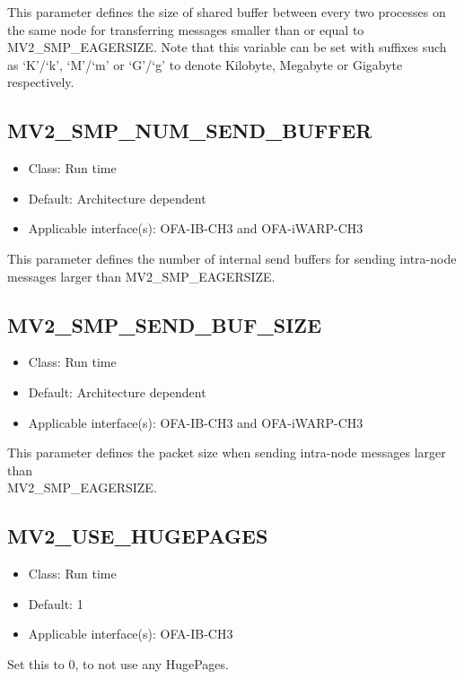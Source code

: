 This parameter defines the size
of shared buffer between every two processes on the same node for transferring
messages smaller than or equal to MV2\_SMP\_EAGERSIZE. 
Note that this variable can be set with suffixes such as `K'/`k', `M'/`m' or `G'/`g'
to denote Kilobyte, Megabyte or Gigabyte respectively.

\subsection{MV2\_SMP\_NUM\_SEND\_BUFFER}
\label{def:smp-num-send-buffer}

\begin{itemize}
        \item Class: Run time
        \item Default: Architecture dependent
    \item Applicable interface(s): OFA-IB-CH3 and OFA-iWARP-CH3
\end{itemize}

This parameter defines the
number of internal send buffers for sending intra-node messages larger
than MV2\_SMP\_EAGERSIZE.


\subsection{MV2\_SMP\_SEND\_BUF\_SIZE}
\label{def:smp-send-buf-size}

\begin{itemize}
        \item Class: Run time
        \item Default: Architecture dependent
    \item Applicable interface(s): OFA-IB-CH3 and OFA-iWARP-CH3
\end{itemize}

This parameter defines the
packet size when sending intra-node messages larger than \\
MV2\_SMP\_EAGERSIZE.


\subsection{MV2\_USE\_HUGEPAGES}
\label{def:use-hugepage}

\begin{itemize}
        \item Class: Run time
        \item Default: 1
        \item Applicable interface(s): OFA-IB-CH3
\end{itemize}
Set this to 0, to not use any HugePages.

